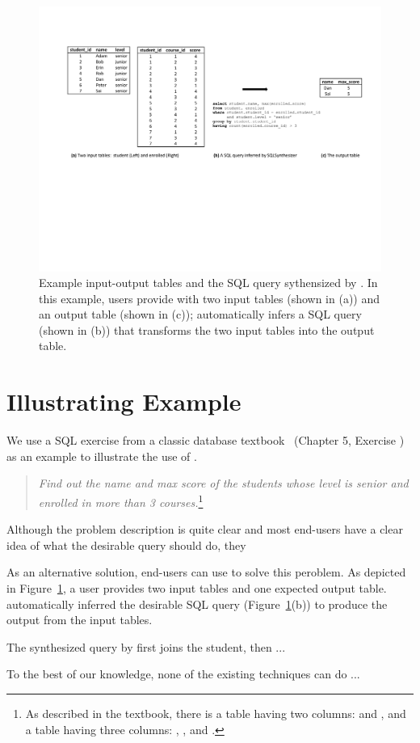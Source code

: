 
\begin{figure}[t]
  \centering
  \includegraphics[scale=0.70]{motivating}
  \vspace*{-1.0ex}\caption {{\label{fig:motivating}
  Example input-output tables and the SQL query sythensized by
  \ourtool. In this example, users provide \ourtool with
  two input tables (shown in (a)) and an output table (shown in (c));
  \ourtool automatically infers a SQL query (shown in (b)) that
  transforms the two input tables into the output table.
}}
\end{figure}

\section{Illustrating Example}
\label{sec:example}

We use a SQL exercise from a classic database textbook~\cite{cowbook} (Chapter 5, Exercise )
as an example to illustrate the use of \ourtool.

\begin{quote}
\textit{Find out the name and max score of the students whose
level is senior and enrolled in more than 3 courses.}\footnote{
As described in the textbook, there is a  table
having two columns:  and , and
a  table having three columns:
, , and .}
\end{quote}


Although the problem description is quite clear and
most end-users have a clear idea of what the desirable
query should do, they 

As an alternative solution, end-users can use \ourtool
to solve this peroblem. As depicted in Figure~\ref{fig:motivating},
a user provides \ourtool two input tables and one expected
output table. \ourtool automatically inferred the desirable
SQL query (Figure~\ref{fig:motivating}(b)) to produce the output from the input tables.


The synthesized query by \ourtool first joins the student, then ... 


To the best of our knowledge, none of the
existing techniques can do ...
